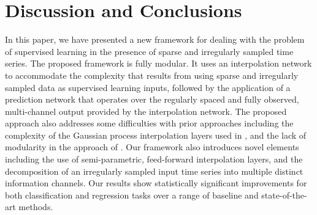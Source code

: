 \documentclass{article} \usepackage{iclr2019_conference,times}
\begin{document}
 

\section{Discussion and Conclusions}

In this paper, we have presented a new framework for dealing with the
problem of supervised learning in the presence of sparse
and irregularly sampled time series. The proposed framework is fully
modular. It uses an interpolation network to accommodate the complexity
that results from using sparse and irregularly sampled data as
supervised learning inputs, followed by the application of 
a prediction network that operates over the regularly spaced and fully
observed, multi-channel output provided by the interpolation network.
The proposed approach also addresses some difficulties with prior 
approaches including the complexity of the Gaussian process
interpolation layers used in \citep{li2016scalable, futoma2017improved}, and 
the lack of modularity in the approach of \cite{che2016recurrent}.
Our framework also introduces novel elements including the
use of semi-parametric, feed-forward interpolation layers,
and the decomposition of an irregularly sampled 
input time series into multiple distinct information channels.
Our results show statistically significant improvements for both classification and regression tasks
 over a range of
baseline and state-of-the-art methods. 
\end{document}
